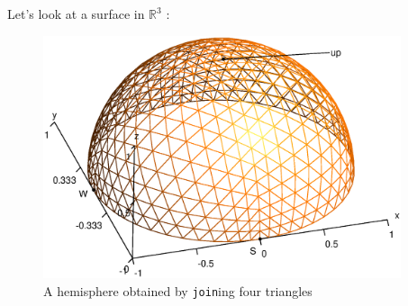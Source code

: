 Let's look at a surface in $ \mathbb{R}^3 $ :

\begin{figure}[ht] \centering
  \includegraphics[width=105mm]{hemisphere}
  \caption{A hemisphere obtained by {\small\tt join}ing four triangles}
  \label{\numb section 2.\numb fig 6}
\end{figure}

